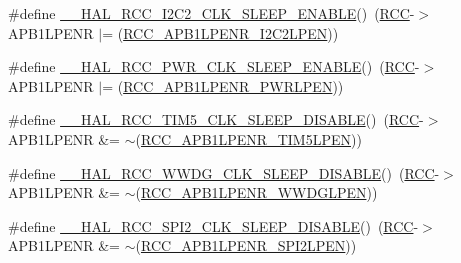\begin{DoxyCompactItemize}
\item 
\#define \hyperlink{group___r_c_c___a_p_b1___low_power___enable___disable_gac0167c77fa1c00add900bb1cf788e68c}{\+\_\+\+\_\+\+H\+A\+L\+\_\+\+R\+C\+C\+\_\+\+I2\+C2\+\_\+\+C\+L\+K\+\_\+\+S\+L\+E\+E\+P\+\_\+\+E\+N\+A\+B\+LE}()~(\hyperlink{group___peripheral__declaration_ga74944438a086975793d26ae48d5882d4}{R\+CC}-\/$>$A\+P\+B1\+L\+P\+E\+NR $\vert$= (\hyperlink{group___peripheral___registers___bits___definition_gaf6a53d37df11a56412ae06f73626f637}{R\+C\+C\+\_\+\+A\+P\+B1\+L\+P\+E\+N\+R\+\_\+\+I2\+C2\+L\+P\+EN}))
\item 
\#define \hyperlink{group___r_c_c___a_p_b1___low_power___enable___disable_gacad9c9770ee2525fccf6a15e4ee7a07a}{\+\_\+\+\_\+\+H\+A\+L\+\_\+\+R\+C\+C\+\_\+\+P\+W\+R\+\_\+\+C\+L\+K\+\_\+\+S\+L\+E\+E\+P\+\_\+\+E\+N\+A\+B\+LE}()~(\hyperlink{group___peripheral__declaration_ga74944438a086975793d26ae48d5882d4}{R\+CC}-\/$>$A\+P\+B1\+L\+P\+E\+NR $\vert$= (\hyperlink{group___peripheral___registers___bits___definition_ga274fa282ad1ff40b747644bf9360feb4}{R\+C\+C\+\_\+\+A\+P\+B1\+L\+P\+E\+N\+R\+\_\+\+P\+W\+R\+L\+P\+EN}))
\item 
\#define \hyperlink{group___r_c_c___a_p_b1___low_power___enable___disable_gaac91e3596950c8d33760debce6b0e416}{\+\_\+\+\_\+\+H\+A\+L\+\_\+\+R\+C\+C\+\_\+\+T\+I\+M5\+\_\+\+C\+L\+K\+\_\+\+S\+L\+E\+E\+P\+\_\+\+D\+I\+S\+A\+B\+LE}()~(\hyperlink{group___peripheral__declaration_ga74944438a086975793d26ae48d5882d4}{R\+CC}-\/$>$A\+P\+B1\+L\+P\+E\+NR \&= $\sim$(\hyperlink{group___peripheral___registers___bits___definition_ga5741a6c45b9de1d0c927beb87f399dd9}{R\+C\+C\+\_\+\+A\+P\+B1\+L\+P\+E\+N\+R\+\_\+\+T\+I\+M5\+L\+P\+EN}))
\item 
\#define \hyperlink{group___r_c_c___a_p_b1___low_power___enable___disable_gae61c24ac6b36e7edbabc5b050b38d63e}{\+\_\+\+\_\+\+H\+A\+L\+\_\+\+R\+C\+C\+\_\+\+W\+W\+D\+G\+\_\+\+C\+L\+K\+\_\+\+S\+L\+E\+E\+P\+\_\+\+D\+I\+S\+A\+B\+LE}()~(\hyperlink{group___peripheral__declaration_ga74944438a086975793d26ae48d5882d4}{R\+CC}-\/$>$A\+P\+B1\+L\+P\+E\+NR \&= $\sim$(\hyperlink{group___peripheral___registers___bits___definition_ga13f3db4ac67bf32c994364cc43f4fe8b}{R\+C\+C\+\_\+\+A\+P\+B1\+L\+P\+E\+N\+R\+\_\+\+W\+W\+D\+G\+L\+P\+EN}))
\item 
\#define \hyperlink{group___r_c_c___a_p_b1___low_power___enable___disable_ga4fff9b3416d2940cac20962e6d5655ec}{\+\_\+\+\_\+\+H\+A\+L\+\_\+\+R\+C\+C\+\_\+\+S\+P\+I2\+\_\+\+C\+L\+K\+\_\+\+S\+L\+E\+E\+P\+\_\+\+D\+I\+S\+A\+B\+LE}()~(\hyperlink{group___peripheral__declaration_ga74944438a086975793d26ae48d5882d4}{R\+CC}-\/$>$A\+P\+B1\+L\+P\+E\+NR \&= $\sim$(\hyperlink{group___peripheral___registers___bits___definition_ga41dcbf845448cbb1b75c0ad7e83b77cb}{R\+C\+C\+\_\+\+A\+P\+B1\+L\+P\+E\+N\+R\+\_\+\+S\+P\+I2\+L\+P\+EN}))

\end{DoxyCompactItemize}
